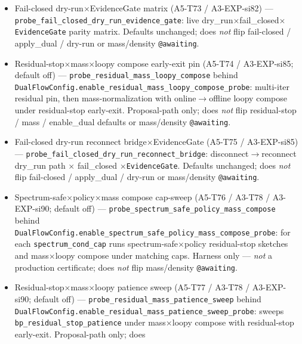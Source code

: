 \documentclass[11pt]{article}
\begin{document}
\begin{itemize}[leftmargin=1.5em]
  A3-EXP-si82; default off) ---
  \texttt{probe\_spectrum\_safe\_policy\_traj} behind
  \texttt{DualFlowConfig.enable\_spectrum\_safe\_policy\_traj\_probe}:
  for each \texttt{spectrum\_cond\_cap} re-runs loopy schedule at
  $1..k$ iters (policy on, residual-stop off) then a final residual-stop
  sketch; still \emph{not} a production certificate.
  \item Fail-closed dry-run$\times$EvidenceGate matrix (A5-T73 /
  A3-EXP-si82) --- \texttt{probe\_fail\_closed\_dry\_run\_evidence\_gate}:
  live dry\_run$\times$fail\_closed$\times$\texttt{EvidenceGate} parity
  matrix. Defaults unchanged; does \emph{not} flip fail-closed /
  apply\_dual / dry-run or mass/density \texttt{@awaiting}.
  \item Residual-stop$\times$mass$\times$loopy compose early-exit pin
  (A5-T74 / A3-EXP-si85; default off) ---
  \texttt{probe\_residual\_mass\_loopy\_compose} behind
  \texttt{DualFlowConfig.enable\_residual\_mass\_loopy\_compose\_probe}:
  multi-iter residual pin, then mass-normalization with
  online$\to$offline loopy compose under residual-stop early-exit.
  Proposal-path only; does \emph{not} flip residual-stop / mass /
  enable\_dual defaults or mass/density \texttt{@awaiting}.
  \item Fail-closed dry-run reconnect bridge$\times$EvidenceGate
  (A5-T75 / A3-EXP-si85) ---
  \texttt{probe\_fail\_closed\_dry\_run\_reconnect\_bridge}:
  disconnect$\to$reconnect dry\_run path $\times$ fail\_closed
  $\times$\texttt{EvidenceGate}. Defaults unchanged; does \emph{not}
  flip fail-closed / apply\_dual / dry-run or mass/density
  \texttt{@awaiting}.
  \item Spectrum-safe$\times$policy$\times$mass compose cap-sweep
  (A5-T76 / A3-T78 / A3-EXP-si90; default off) ---
  \texttt{probe\_spectrum\_safe\_policy\_mass\_compose} behind
  \texttt{DualFlowConfig.enable\_spectrum\_safe\_policy\_mass\_compose\_probe}:
  for each \texttt{spectrum\_cond\_cap} runs spectrum-safe$\times$policy
  residual-stop sketches and mass$\times$loopy compose under matching
  caps. Harness only --- \emph{not} a production certificate; does
  \emph{not} flip mass/density \texttt{@awaiting}.
  \item Residual-stop$\times$mass$\times$loopy patience sweep
  (A5-T77 / A3-T78 / A3-EXP-si90; default off) ---
  \texttt{probe\_residual\_mass\_patience\_sweep} behind
  \texttt{DualFlowConfig.enable\_residual\_mass\_patience\_sweep\_probe}:
  sweeps \texttt{bp\_residual\_stop\_patience} under mass$\times$loopy
  compose with residual-stop early-exit. Proposal-path only; does

\end{itemize}
\end{document}
